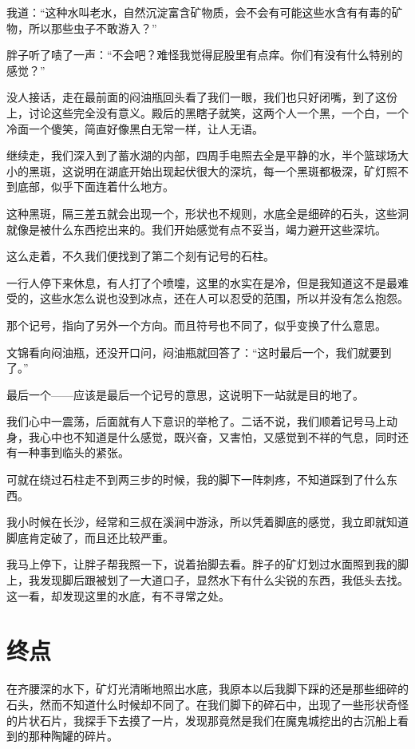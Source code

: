 我道：“这种水叫老水，自然沉淀富含矿物质，会不会有可能这些水含有有毒的矿物，所以那些虫子不敢游入？”

胖子听了啧了一声：“不会吧？难怪我觉得屁股里有点痒。你们有没有什么特别的感觉？”

没人接话，走在最前面的闷油瓶回头看了我们一眼，我们也只好闭嘴，到了这份上，讨论这些完全没有意义。殿后的黑瞎子就笑，这两个人一个黑，一个白，一个冷面一个傻笑，简直好像黑白无常一样，让人无语。

继续走，我们深入到了蓄水湖的内部，四周手电照去全是平静的水，半个篮球场大小的黑斑，这说明在湖底开始出现起伏很大的深坑，每一个黑斑都极深，矿灯照不到底部，似乎下面连着什么地方。

这种黑斑，隔三差五就会出现一个，形状也不规则，水底全是细碎的石头，这些洞就像是被什么东西挖出来的。我们开始感觉有点不妥当，竭力避开这些深坑。

这么走着，不久我们便找到了第二个刻有记号的石柱。

一行人停下来休息，有人打了个喷嚏，这里的水实在是冷，但是我知道这不是最难受的，这些水怎么说也没到冰点，还在人可以忍受的范围，所以并没有怎么抱怨。

那个记号，指向了另外一个方向。而且符号也不同了，似乎变换了什么意思。

文锦看向闷油瓶，还没开口问，闷油瓶就回答了：“这时最后一个，我们就要到了。”

最后一个——应该是最后一个记号的意思，这说明下一站就是目的地了。

我们心中一震荡，后面就有人下意识的举枪了。二话不说，我们顺着记号马上动身，我心中也不知道是什么感觉，既兴奋，又害怕，又感觉到不祥的气息，同时还有一种事到临头的紧张。

可就在绕过石柱走不到两三步的时候，我的脚下一阵刺疼，不知道踩到了什么东西。

我小时候在长沙，经常和三叔在溪涧中游泳，所以凭着脚底的感觉，我立即就知道脚底肯定破了，而且还比较严重。

我马上停下，让胖子帮我照一下，说着抬脚去看。胖子的矿灯划过水面照到我的脚上，我发现脚后跟被划了一大道口子，显然水下有什么尖锐的东西，我低头去找。这一看，却发现这里的水底，有不寻常之处。

\chapter{终点}

在齐腰深的水下，矿灯光清晰地照出水底，我原本以后我脚下踩的还是那些细碎的石头，然而不知道什么时候却不同了。在我们脚下的碎石中，出现了一些形状奇怪的片状石片，我探手下去摸了一片，发现那竟然是我们在魔鬼城挖出的古沉船上看到的那种陶罐的碎片。

